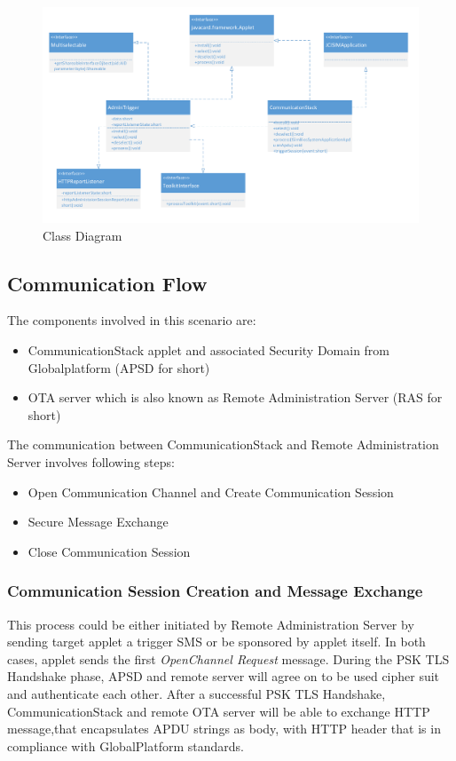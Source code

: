 \begin{figure}[!htbp]
	\centering
	\includegraphics[width=1.0\textwidth]{class}
		\caption{Class Diagram}
	\label{fig:class}
\end{figure}

\subsection {Communication Flow}

The components involved in this scenario are:
 \begin{itemize}
  \item CommunicationStack applet and associated Security Domain from Globalplatform (APSD  for short)
  \item OTA server which is also known as Remote Administration Server (RAS for short)
\end{itemize}

The communication between CommunicationStack and Remote Administration Server involves following  steps:

 \begin{itemize}
  \item Open Communication Channel and Create Communication Session
  \item Secure Message Exchange
  \item Close Communication Session
\end{itemize}
\subsubsection{Communication Session Creation and Message Exchange}
This process could be either initiated by Remote Administration Server by sending target applet a trigger SMS or be sponsored by applet itself. In both cases, applet sends the first \emph{OpenChannel Request} message. During the PSK TLS Handshake phase, APSD and remote server will agree on to be used cipher suit and authenticate each other. After a successful PSK TLS Handshake, CommunicationStack and remote OTA server will be able to exchange HTTP message,that encapsulates APDU strings as body, with HTTP header that is in compliance with GlobalPlatform standards.


